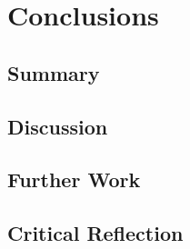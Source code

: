 \chapter{Conclusions}

\section{Summary}

\section{Discussion}

\section{Further Work}

\section{Critical Reflection}